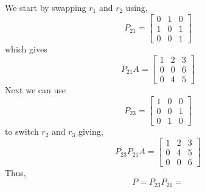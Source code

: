 \begin{enumerate}[label=(\alph*)]
        \begin{mdframed}[style=MyFrame]
            We start by swapping $r_{1}$ and $r_{2}$ using,
            \begin{equation}
                P_{21} =
                \begin{bmatrix}
                    0       &       1       &       0       \\
                    1       &       0       &       1       \\
                    0       &       0       &       1
                \end{bmatrix}
            \end{equation}
            which gives
            \begin{equation}
                P_{21}A = 
                \begin{bmatrix}
                    1       &       2       &       3       \\
                    0       &       0       &       6       \\
                    0       &       4       &       5
                \end{bmatrix}
            \end{equation}
            Next we can use
            \begin{equation}
                P_{23} =
                \begin{bmatrix}
                    1       &       0       &       0       \\
                    0       &       0       &       1       \\
                    0       &       1       &       0
                \end{bmatrix}
            \end{equation}
            to switch $r_{2}$ and $r_{3}$ giving, 
            \begin{equation}
                P_{23} P_{21} A = 
                \begin{bmatrix}
                    1       &       2       &       3       \\
                    0       &       4       &       5       \\
                    0       &       0       &       6  
                \end{bmatrix}
            \end{equation}
            Thus,
            \begin{equation}
                P = P_{23}P_{21} = 

\end{equation}
\end{mdframed}
\end{enumerate}
